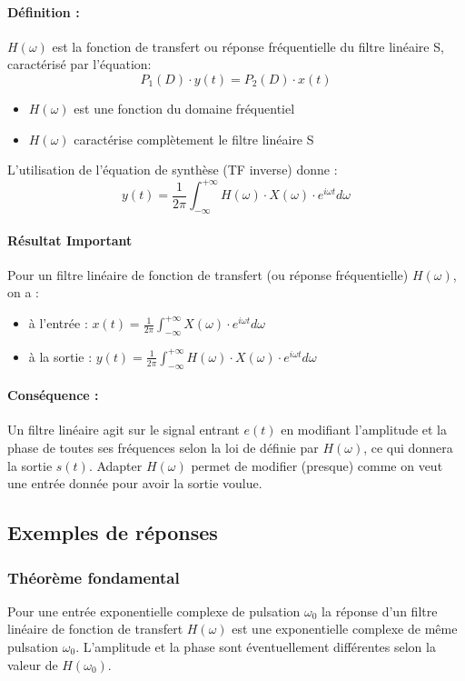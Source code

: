 \documentclass[10pt,a4paper,twoside]{article}
\begin{document}
\paragraph{Définition :} $H(\omega)$ est la fonction de transfert ou réponse fréquentielle du filtre linéaire S, caractérisé par l'équation:
$$P_{1}(D)\cdot y(t) = P_{2}(D)\cdot x(t)$$
\begin{itemize}
\item $H(\omega)$ est une fonction du domaine fréquentiel
\item $H(\omega)$ caractérise complètement le filtre linéaire S
\end{itemize}
L'utilisation de l'équation de synthèse (TF inverse) donne :
$$y(t)=\frac{1}{2\pi} \int_{-\infty}^{+\infty}H(\omega)\cdot X(\omega)\cdot e^{i\omega t} d\omega$$

\paragraph{Résultat Important} Pour un filtre linéaire de fonction de transfert (ou réponse fréquentielle) $H(\omega)$, on a :
\begin{itemize}
\item à l'entrée : $x(t)=\frac{1}{2\pi}\int_{-\infty}^{+\infty}X(\omega)\cdot e^{i\omega t}d\omega$
\item à la sortie : $y(t)=\frac{1}{2\pi}\int_{-\infty}^{+\infty}H(\omega)\cdot X(\omega)\cdot e^{i\omega t}d\omega$
\end{itemize}

\paragraph{Conséquence :} Un filtre linéaire agit sur le signal entrant $e(t)$ en modifiant l'amplitude et la phase de toutes ses fréquences selon la loi de définie par $H(\omega)$, ce qui donnera la sortie $s(t)$. Adapter $H(\omega)$ permet de modifier (presque) comme on veut une entrée donnée pour avoir la sortie voulue.

\subsection{Exemples de réponses}
\subsubsection{Théorème fondamental}
Pour une entrée exponentielle complexe de pulsation $\omega_{0}$ la réponse d'un filtre linéaire de fonction de transfert $H(\omega)$ est une exponentielle complexe de même pulsation $\omega_{0}$. L'amplitude et la phase sont éventuellement différentes selon la valeur de $H(\omega_{0})$.
\end{document}
